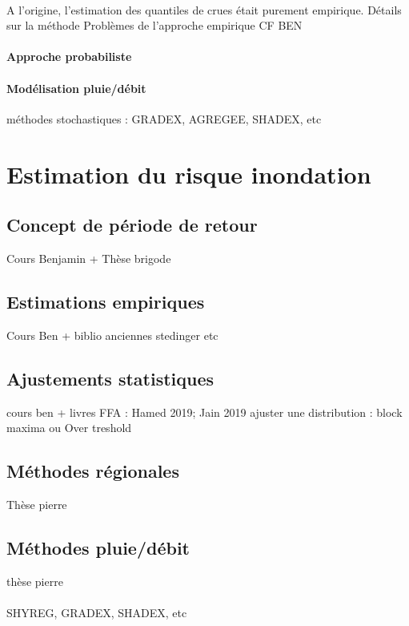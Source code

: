 \documentclass[11pt]{article}
\begin{document}
	\paragraph{} A l'origine, l'estimation des quantiles de crues était purement empirique. 
	Détails sur la méthode
	Problèmes de l'approche empirique CF BEN
		
	\paragraph{Approche probabiliste} 

	\paragraph{Modélisation pluie/débit} méthodes stochastiques : GRADEX, AGREGEE, SHADEX, etc




\section{Estimation du risque inondation}
		\subsection{Concept de période de retour}
		Cours Benjamin + Thèse brigode 
		
	    \subsection{Estimations empiriques}
	    Cours Ben + biblio anciennes stedinger etc
	    \subsection{Ajustements statistiques}
	    cours ben + livres FFA : Hamed 2019; Jain 2019
	    ajuster une distribution : block maxima ou Over treshold
	    \subsection{Méthodes régionales}
	    Thèse pierre
	    \subsection{Méthodes pluie/débit}
	    thèse pierre
	    \paragraph{} SHYREG, GRADEX, SHADEX, etc
	    
\end{document}
